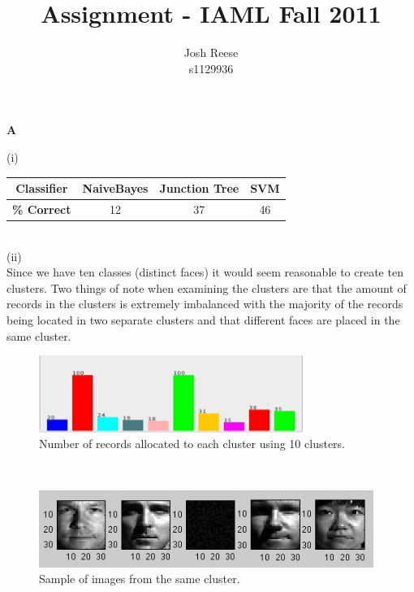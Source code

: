 \documentclass{report}
\begin{document}
\title{Assignment - IAML Fall 2011}
\author{Josh Reese\\s1129936}
\maketitle
\begin{center}{\bf \LARGE{A}}\end{center}
(i)\\
\begin{table}[h]
  \centering
  \begin{tabular}{|c|c|c|c|}
    \hline
    {\bf Classifier} & {\bf NaiveBayes} & {\bf Junction Tree} & {\bf SVM}\\
    \hline
    {\bf \% Correct} & 12 & 37 & 46\\
    \hline
  \end{tabular}
  \label{table}
\end{table}\\
(ii)\\
Since we have ten classes (distinct faces) it would seem reasonable to
create ten clusters. Two things of note when examining the clusters are
that the amount of records in the clusters is extremely imbalanced
with the majority of the records being located in two separate
clusters and that different faces are placed in the same cluster.\\
\begin{figure}[h]
  \centering
  \includegraphics[height=25mm]{images/AiiClusters.jpg}
  \caption{Number of records allocated to each cluster using 10 clusters.}
  \label{fig}
\end{figure}\\
\begin{figure}[h]
  \centering
  \includegraphics[height=25mm]{images/AiiFaces.jpg}
  \caption{Sample of images from the same cluster.}
  \label{fig}
\end{figure}\\
\end{document}
